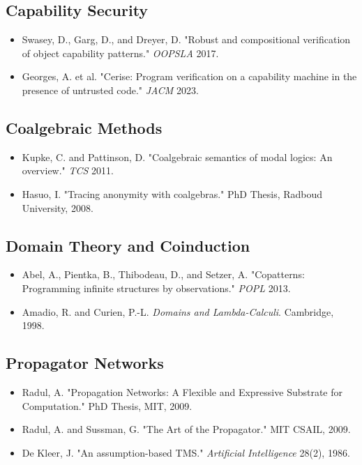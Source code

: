 \documentclass[11pt]{article}
\begin{document}
\subsection{Capability Security}
\label{sec:org56859bc}
\begin{itemize}
\item Swasey, D., Garg, D., and Dreyer, D. "Robust and compositional verification of object capability patterns." \emph{OOPSLA} 2017.
\item Georges, A. et al. "Cerise: Program verification on a capability machine in the presence of untrusted code." \emph{JACM} 2023.
\end{itemize}
\subsection{Coalgebraic Methods}
\label{sec:org9afd08f}
\begin{itemize}
\item Kupke, C. and Pattinson, D. "Coalgebraic semantics of modal logics: An overview." \emph{TCS} 2011.
\item Hasuo, I. "Tracing anonymity with coalgebras." PhD Thesis, Radboud University, 2008.
\end{itemize}
\subsection{Domain Theory and Coinduction}
\label{sec:org9c1a458}
\begin{itemize}
\item Abel, A., Pientka, B., Thibodeau, D., and Setzer, A. "Copatterns: Programming infinite structures by observations." \emph{POPL} 2013.
\item Amadio, R. and Curien, P.-L. \emph{Domains and Lambda-Calculi}. Cambridge, 1998.
\end{itemize}
\subsection{Propagator Networks}
\label{sec:orgf1e283b}
\begin{itemize}
\item Radul, A. "Propagation Networks: A Flexible and Expressive Substrate for Computation." PhD Thesis, MIT, 2009.
\item Radul, A. and Sussman, G. "The Art of the Propagator." MIT CSAIL, 2009.
\item De Kleer, J. "An assumption-based TMS." \emph{Artificial Intelligence} 28(2), 1986.
\end{itemize}
\end{document}
